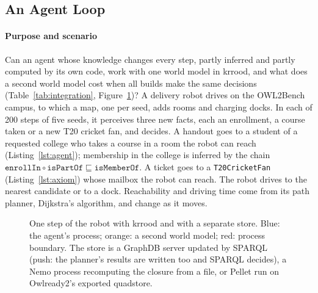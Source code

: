 \documentclass[sigconf,anonymous]{aamas}
\begin{document}
\subsection{An Agent Loop}
\label{ssec:agent_loop}

\paragraph{Purpose and scenario}
Can an agent whose knowledge changes every step, partly inferred and partly computed by its own code, work with one world model in \ac{krrood}, and what does a second world model cost when all builds make the same decisions (Table~\ref{tab:integration}, Figure~\ref{fig:builds})? A delivery robot drives on the OWL2Bench campus, to which a map, one per seed, adds rooms and charging docks. In each of 200 steps of five seeds, it perceives three new facts, each an enrollment, a course taken or a new T20 cricket fan, and decides. A handout goes to a student of a requested college who takes a course in a room the robot can reach (Listing~\ref{lst:agent}); membership in the college is inferred by the chain $\texttt{enrollIn}\circ\texttt{isPartOf}\sqsubseteq\texttt{isMemberOf}$. A ticket goes to a \texttt{T20CricketFan} (Listing~\ref{lst:axiom}) whose mailbox the robot can reach. The robot drives to the nearest candidate or to a dock. Reachability and driving time come from its path planner, Dijkstra's algorithm, and change as it moves.

\begin{table}[t]
  \centering
  \caption{The delivery robot built in five ways (Owlready2: one seed; \acs{krrood}: earlier version with reuse of results, separate run). Push: the planner's results written into GraphDB. Writes, round trips: medians per step. Step: median over 1,000 steps (each seed within 8\%), or Owlready2's 200. ``1 run'': a Nemo or Pellet process per step. Boundary lines: sync.\ lines plus code mapping perceptions and wrapping the planner. Best per row in bold.}
  \label{tab:integration}
  \footnotesize
  \setlength{\tabcolsep}{2.4pt}
  
\end{table}

\begin{figure}[t]
  \centering
  
  \caption{One step of the robot with \acs{krrood} and with a separate store. Blue: the agent's process; orange: a second world model; red: process boundary. The store is a GraphDB server updated by SPARQL (push: the planner's results are written too and SPARQL decides), a Nemo process recomputing the closure from a file, or Pellet run on Owlready2's exported quadstore.}
  \label{fig:builds}
\end{figure}
\end{document}
